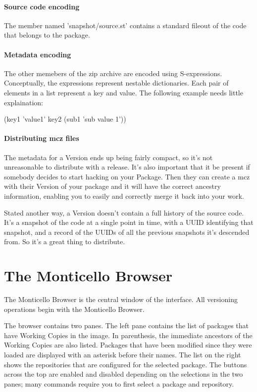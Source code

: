 \documentclass[a4paper,10pt,twoside]{book}
\begin{document}
\paragraph{Source code encoding}

The member named 'snapshot/source.st' contains a standard fileout of the code that belongs to the package.

\paragraph{Metadata encoding}

The other memebers of the zip archive are encoded using S-expressions. Conceptually, the expressions represent nestable dictionaries. Each pair of elements in a list represent a key and value. The following example needs little explaination:

(key1 'value1' key2 (sub1 'sub value 1'))

\paragraph{Distributing mcz files}

The metadata for a Version ends up being fairly compact, so it's not unreasonable to distribute with a release. It's also important that it be present if somebody decides to start hacking on your Package. Then they can create a mcz with their Version of your package and it will have the correct ancestry information, enabling you to easily and correctly merge it back into your work.

Stated another way, a Version doesn't contain a full history of the source code. It's a snapshot of the code at a single point in time, with a UUID identifying that snapshot, and a record of the UUIDs of all the previous snapshots it's descended from. So it's a great thing to distribute.

\section{The Monticello Browser}

The Monticello Browser is the central window of the interface. All versioning operations begin with the Monticello Browser.

The browser contains two panes. The left pane contains the list of packages that have Working Copies in the image. In parenthesis, the immediate ancestors of the Working Copies are also listed. Packages that have been modified since they were loaded are displayed with an asterisk before their names. The list on the right shows the repositories that are configured for the selected package. The buttons across the top are enabled and disabled depending on the selections in the two panes; many commands require you to first select a package and repository.
\end{document}
